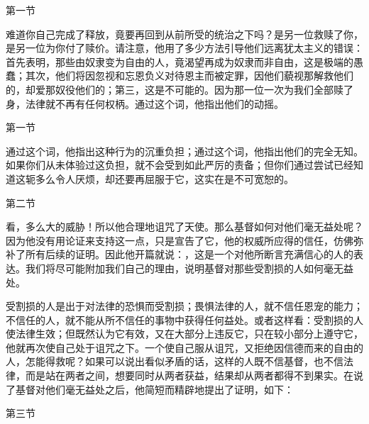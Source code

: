 第一节 \par

\par

难道你自己完成了释放，竟要再回到从前所受的统治之下吗？是另一位救赎了你，是另一位为你付了赎价。请注意，他用了多少方法引导他们远离犹太主义的错误：首先表明，那些由奴隶变为自由的人，竟渴望再成为奴隶而非自由，这是极端的愚蠢；其次，他们将因忽视和忘恩负义对待恩主而被定罪，因他们藐视那解救他们的，却爱那奴役他们的；第三，这是不可能的。因为那一位一次为我们全部赎了身，法律就不再有任何权柄。通过这个词，他指出他们的动摇。\par

第一节  \par

通过这个词，他指出这种行为的沉重负担；通过这个词，他指出他们的完全无知。如果你们从未体验过这负担，就不会受到如此严厉的责备；但你们通过尝试已经知道这轭多么令人厌烦，却还要再屈服于它，这实在是不可宽恕的。\par

第二节  \par

看，多么大的威胁！所以他合理地诅咒了天使。那么基督如何对他们毫无益处呢？因为他没有用论证来支持这一点，只是宣告了它，他的权威所应得的信任，仿佛弥补了所有后续的证明。因此他开篇就说：，这是一个对他所断言充满信心的人的表达。我们将尽可能附加我们自己的理由，说明基督对那些受割损的人如何毫无益处。\par

受割损的人是出于对法律的恐惧而受割损；畏惧法律的人，就不信任恩宠的能力；不信任的人，就不能从所不信任的事物中获得任何益处。或者这样看：受割损的人使法律生效；但既然认为它有效，又在大部分上违反它，只在较小部分上遵守它，他就再次使自己处于诅咒之下。一个使自己服从诅咒，又拒绝因信德而来的自由的人，怎能得救呢？如果可以说出看似矛盾的话，这样的人既不信基督，也不信法律，而是站在两者之间，想要同时从两者获益，结果却从两者都得不到果实。在说了基督对他们毫无益处之后，他简短而精辟地提出了证明，如下：\par

第三节  \par

